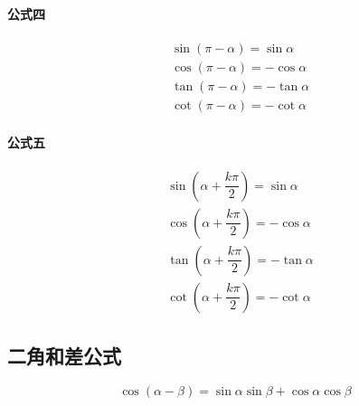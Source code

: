 \documentclass[a4paper, 12pt, draft]{article}
\begin{document}
    \paragraph{公式四}
    \begin{equation}
        \begin{aligned}
            &\sin{(\pi - \alpha)} = \sin{\alpha} \\
            &\cos{(\pi - \alpha)} = -\cos{\alpha} \\
            &\tan{(\pi - \alpha)} = -\tan{\alpha} \\
            &\cot{(\pi - \alpha)} = -\cot{\alpha}
        \end{aligned}
    \end{equation}

    \paragraph{公式五}
    \begin{equation}
        \begin{aligned}
            &\sin{(\alpha + \dfrac{k\pi}{2})} = \sin{\alpha} \\
            &\cos{(\alpha + \dfrac{k\pi}{2})} = -\cos{\alpha} \\
            &\tan{(\alpha + \dfrac{k\pi}{2})} = -\tan{\alpha} \\
            &\cot{(\alpha + \dfrac{k\pi}{2})} = -\cot{\alpha}
        \end{aligned}
    \end{equation}


    \subsection{二角和差公式}
    \begin{equation}\label{二角和差公式}
        \cos{(\alpha - \beta)} = \sin{\alpha}\sin{\beta} + \cos{\alpha}\cos{\beta}
    \end{equation}
\end{document}

